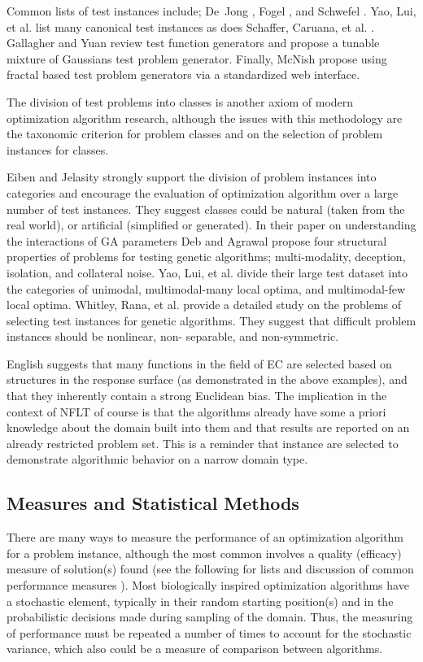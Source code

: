 \documentclass[a4paper, 11pt]{article}
\begin{document}
Common lists of test instances include; De~Jong \cite{Jong1975}, Fogel \cite{Fogel1995}, and Schwefel \cite{Schwefel1995}. Yao, Lui, et al. \cite{Yao1999} list many canonical test instances as does Schaffer, Caruana, et al. \cite{Schaffer1989}. Gallagher and Yuan \cite{Gallagher2006} review test function generators and propose a tunable mixture of Gaussians test problem generator. Finally, McNish \cite{MacNish2005} propose using fractal based test problem generators via a standardized web interface.

The division of test problems into classes is another axiom of modern optimization algorithm research, although the issues with this methodology are the taxonomic criterion for problem classes and on the selection of problem instances for classes.

Eiben and Jelasity \cite{Eiben2002} strongly support the division of problem instances into categories and encourage the evaluation of optimization algorithm over a large number of test instances. They suggest classes could be natural (taken from the real world), or artificial (simplified or generated). In their paper on understanding the interactions of GA parameters Deb and Agrawal \cite{Deb1999} propose four structural properties of problems for testing genetic algorithms; multi-modality, deception, isolation, and collateral noise. Yao, Lui, et al. \cite{Yao1999} divide their large test dataset into the categories of unimodal,	multimodal-many	local	optima,	and multimodal-few local optima. Whitley, Rana, et al. \cite{Whitley1996} provide a detailed study on the problems of selecting test instances for genetic algorithms. They suggest that difficult problem instances should be nonlinear, non- separable, and non-symmetric.

English \cite{English1996} suggests that many functions in the field of EC are selected based on structures in the response surface (as demonstrated in the above examples), and that they inherently contain a strong Euclidean bias. The implication in the context of NFLT of course is that the algorithms already have some a priori knowledge about the domain built into them and that results are reported on an already restricted problem set. This is a reminder that instance are selected to demonstrate algorithmic behavior on a narrow domain type.

% 
% 
\subsection{Measures and Statistical Methods}
There are many ways to measure the performance of an optimization algorithm for a problem instance, although the most common involves a quality (efficacy) measure of solution(s) found (see the following for lists and discussion of common performance measures \cite{Bartz-Beielstein2004, Birattari2005a, Hughes2006, Eiben2002, Barr1995}). Most biologically inspired optimization algorithms have a stochastic element, typically in their random starting position(s) and in the probabilistic decisions made during sampling of the domain. Thus, the measuring of performance must be repeated a number of times to account for the stochastic variance, which also could be a measure of comparison between algorithms.
\end{document}
